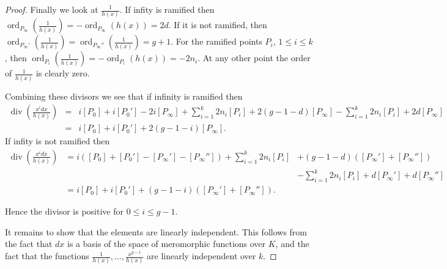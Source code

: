 \documentclass[11pt]{article} %
\theoremstyle{remark}\newtheorem*{rem}{Remark}
\DeclareMathOperator{\ord}{ord}
\DeclareMathOperator{\di}{div}
\begin{document}
\begin{proof}
Finally we look at $\frac{1}{h(x)}$.
If infity is ramified then $\ord_{P_{\infty}}\left(\frac{1}{h(x)}\right) = -\ord_{P_{\infty}}(h(x)) = 2d$.
If it is not ramified, then $\ord_{P_{\infty}'}\left(\frac{1}{h(x)}\right) = \ord_{P_{\infty}''}\left(\frac{1}{h(x)}\right)=g+1$.
For the ramified points $P_i$, $1\leq i \leq k$, then $\ord_{P_i}\left(\frac{1}{h(x)}\right) = -\ord_{P_i}(h(x))= -2n_i$.
At any other point the order of $\frac{1}{h(x)}$ is clearly zero.


Combining these divisors we see that if infinity is ramified then
\begin{eqnarray*}
 \di \left( \frac{x^idx}{h(x)}\right) & = & i[P_0]+ i[P_0'] -2i[P_{\infty}] +\sum_{i=1}^{k}2n_i[P_i] + 2(g-1-d)[P_{\infty}] - \sum_{i=1}^{k}2n_i[P_i] +2d[P_{\infty}]\\
 & = & i[P_0]+ i[P_0'] +2(g-1 -i)[P_{\infty}].
 \end{eqnarray*}
 If infity is not ramified then 
 \begin{eqnarray*}
  \di \left( \frac{x^idx}{h(x)}\right) & =  i([P_0]+ [P_0'] -[P_{\infty}']-[P_{\infty}'']) +\sum_{i=1}^{k}2n_i[P_i] & + (g-1-d)([P_{\infty}']+[P_{\infty}''])\\
  & & - \sum_{i=1}^{k}2n_i[P_i] +d[P_{\infty}']+d[P_{\infty}'']\\
 & =  i[P_0]+ i[P_0'] +(g-1 -i)([P_{\infty}']+[P_{\infty}'']).&
 \end{eqnarray*}

Hence the divisor is positive for $0\leq i \leq g-1$.




It remains to show that the elements are linearly independent.
This follows from the fact that $dx$ is a basis of the space of meromorphic functions over $K$, and the fact that the functions $\frac{1}{h(x)},\ldots , \frac{x^{g-1}}{h(x)}$ are linearly independent over $k$.
\end{proof}





\end{document}
